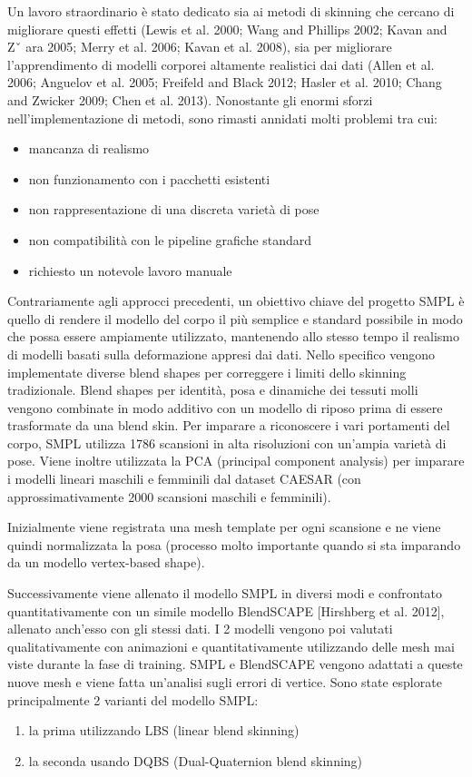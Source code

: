 Un lavoro straordinario è stato dedicato sia ai metodi di skinning che cercano di migliorare questi effetti (Lewis et al. 2000; Wang and Phillips 2002; Kavan and Zˇ ara 2005; Merry et al. 2006; Kavan et al. 2008), sia per migliorare l’apprendimento di modelli corporei altamente realistici dai dati (Allen et al. 2006; Anguelov et al. 2005; Freifeld and Black 2012; Hasler et al. 2010; Chang and Zwicker 2009; Chen et al. 2013).
Nonostante gli enormi sforzi nell’implementazione di metodi, sono rimasti annidati molti problemi tra cui:
\begin{itemize}
\item mancanza di realismo
\item non funzionamento con i pacchetti esistenti
\item non rappresentazione di una discreta varietà di pose
\item non compatibilità con le pipeline grafiche standard
\item richiesto un notevole lavoro manuale
\end{itemize}

Contrariamente agli approcci precedenti, un obiettivo chiave del progetto SMPL è quello di rendere il modello del corpo il più semplice e standard possibile in modo che possa essere ampiamente utilizzato, mantenendo allo stesso tempo il  realismo di modelli basati sulla deformazione appresi dai dati. Nello specifico vengono implementate diverse blend shapes per correggere i limiti dello skinning tradizionale.
Blend shapes per identità, posa e dinamiche dei tessuti molli vengono combinate in modo additivo con un modello di riposo prima di essere trasformate da una blend skin.
Per imparare a riconoscere i vari portamenti del corpo, SMPL utilizza 1786 scansioni in alta risoluzioni con un'ampia varietà di pose.
Viene inoltre utilizzata la PCA (principal component analysis) per imparare i modelli lineari maschili e femminili dal dataset CAESAR (con approssimativamente 2000 scansioni maschili e femminili). 

\medskip

Inizialmente viene registrata una mesh template per ogni scansione e ne viene quindi normalizzata la posa (processo molto importante quando si sta imparando da un modello vertex-based shape).


\medskip

Successivamente viene allenato il modello SMPL in diversi modi e confrontato quantitativamente con un simile modello BlendSCAPE [Hirshberg et al. 2012], allenato anch’esso con gli stessi dati.
I 2 modelli vengono poi valutati qualitativamente con animazioni e quantitativamente utilizzando delle mesh mai viste durante la fase di training.
SMPL e BlendSCAPE vengono adattati a queste nuove mesh e viene fatta un’analisi sugli errori di vertice.
Sono state esplorate principalmente 2 varianti del modello SMPL:
\begin{enumerate}
\item la prima utilizzando LBS (linear blend skinning)
\item la seconda usando DQBS (Dual-Quaternion blend skinning)
\end{enumerate}

